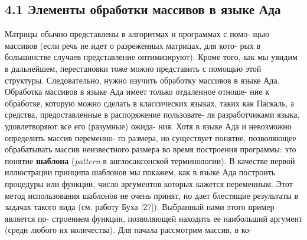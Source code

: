 \subsection{4.1 Элементы обработки массивов в языке Ада}
\noindent
Матрицы  обычно  представлены  в  алгоритмах  и  программах с  помо-\linebreak
щью массивов  (если  речь  не  идет о разреженных  матрицах,  для кото-\linebreak
рых в большинстве случаев представление оптимизируют). Кроме того,\linebreak
как мы увидим  в дальнейшем,  перестановки тоже можно представить\linebreak
с помощью этой структуры.  Следовательно, нужно изучить обработку\linebreak
массивов в языке Ада.\newline
\hspace*{15pt}Обработка массивов в языке Ада имеет только отдаленное отноше-\linebreak
ние к обработке, которую можно сделать в классических языках, таких\linebreak
как Паскаль, а средства, предоставленные в распоряжение пользовате-\linebreak
ля  разработчиками  языка,  удовлетворяют все  его  (разумные)  ожида­-\linebreak
ния.  Хотя  в  языке  Ада  и  невозможно  определить  массив  переменно-\linebreak
го размера, но существует понятие, позволяющее обрабатывать массив\linebreak
неизвестного  размера  во  время  построения  программы:  это  понятие\linebreak
\textbf{шаблона} (\textit{pattern} в англосаксонской терминологии).
\newpage
В качестве первой иллюстрации принципа шаблонов мы покажем,\linebreak
как в языке Ада построить процедуры или функции, число аргументов\linebreak
которых кажется переменным. Этот метод использования шаблонов не\linebreak
очень принят,  но дает блестящие результаты в задачах такого вида\linebreak
(см.  работу Буха [27]).  Выбранный нами этого пример является по-\linebreak
строением функции, позволяющей находить ее  наибольший аргумент\linebreak
(среди любого их количества). Для начала рассмотрим массив,  в ко­-\linebreak
